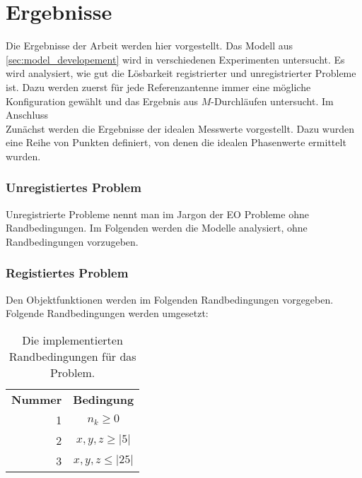 \section{Ergebnisse}
%
Die Ergebnisse der Arbeit werden hier vorgestellt. Das Modell aus \ref{sec:model_developement} wird in verschiedenen Experimenten untersucht.%
Es wird analysiert, wie gut die Lösbarkeit registrierter und unregistrierter Probleme ist. Dazu werden zuerst für jede Referenzantenne immer eine mögliche Konfiguration gewählt und das Ergebnis aus $M$-Durchläufen untersucht. Im Anschluss %
\\
Zunächst werden die Ergebnisse der idealen Messwerte vorgestellt. Dazu wurden eine Reihe von Punkten definiert, von denen die idealen Phasenwerte ermittelt wurden.
%
\subsubsection{Unregistiertes Problem}
%
Unregistrierte Probleme nennt man im Jargon der EO Probleme ohne Randbedingungen. Im Folgenden werden die Modelle analysiert, ohne Randbedingungen vorzugeben. 
%
\subsubsection{Registiertes Problem}
%
Den Objektfunktionen werden im Folgenden Randbedingungen vorgegeben. Folgende Randbedingungen werden umgesetzt:
%
\begin{table} [ht!]
	\begin{center}
		\begin{tabular}{rc}
			\textbf{Nummer} & \textbf{Bedingung} \\
			1 & $n_k\ge0$ \\
			2 & $x,y,z \ge |5|$\\
			3 & $x,y,z \le |25|$\\
%			
		\end{tabular}
	\end{center}
	\caption[Randbedingungen für Optimierung]{Die implementierten Randbedingungen für das Problem.}
	\label{tab:registrations}
\end{table}
%
